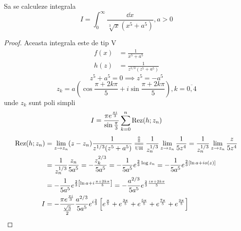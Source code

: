     \begin{aplicatie}
        Sa se calculeze integrala
        \[
            I = \int_{0}^{\infty} \frac{\dd x}{\sqrt[3]{x}(x^5+a^5)} , a > 0
        \]
        \begin{proof}
            Aceasta integrala este de tip $\mathrm{V}$
            \begin{align*}
                f(x) &= \frac{1}{x^5+a^5} \\
                h(z) &= \frac{1}{z^{1/3}(z^5+a^5)}
            \end{align*}
            \[
                z^5+a^5 = 0 \implies z^5 = -a^5
            \]
            \[
                z_k = a\left( \cos \frac{\pi+2k\pi}{5} + i \sin \frac{\pi+2k\pi}{5} \right)
                , k = \overline{0,4}
            \]
            unde $z_k$ sunt poli simpli
            \[
                I = \frac {\pi e^{\frac{\pi i}{3}}}{\sin \frac{\pi}{3}}
                    \sum_{k=0}^{n} \operatorname{Rez}(h;z_n)
            \]
            \begin{align*}
                \Rez(h;z_n) &= \lim_{z\to z_n}(z-z_n)\frac{1}{z^{1/3}(z^5+a^5)}
                    \EqConformCaz
                    \frac{1}{z_n^{1/3}} \lim_{z\to z_n} \frac{1}{5z^4}
                    = \frac{1}{z_n^{1/3}} \lim_{z\to z_n} \frac{z}{5z^4}
                    \\
                    &= \frac{1}{z_n^{1/3}} \frac{z_n}{5a^5}
                    = - \frac{z_k^{2/3}}{5a^5}
                    = - \frac{1}{5a^5} e^{\frac{2}{3}\log z_n}
                    = - \frac{1}{5a^5} e^{\frac{2}{3} [\ln a + i o(z)]}
                    \\
                    &= - \frac{1}{5a^5} e^{\frac{2}{3} \left[\ln a + i \frac{\pi+2k\pi}{5}\right]}
                    = - \frac{a^{2/3}}{5a^5} e^{\frac{2}{3} \frac{i \pi + 2k\pi}{5}}
                    \\
                I &= -\frac{\pi e^{\frac{\pi i}{3}}}{\frac{\sqrt{3}}{2}} \frac{a^{2/3}}{5a^5}
                    e^{i\frac{2}{3}}
                    \left[e^{\frac{\pi}{5}} + e^{\frac{3 \pi}{5}}
                    + e^{\frac{5 \pi}{5}} +e^{\frac{7 \pi}{5}} +e^{\frac{9 \pi}{5}}
                    \right]
            \end{align*}
        \end{proof}
    \end{aplicatie}